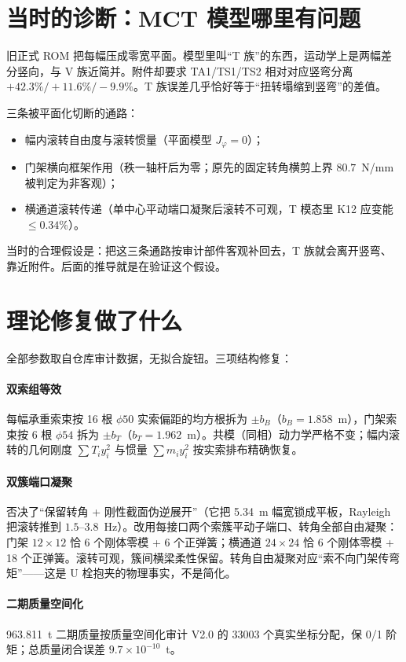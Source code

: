 \documentclass[11pt,a4paper]{ctexart}
\begin{document}
\section{当时的诊断：MCT 模型哪里有问题}

旧正式 ROM 把每幅压成零宽平面。模型里叫``T 族''的东西，运动学上是两幅差分竖向，与 V 族近简并。附件却要求 TA1/TS1/TS2 相对对应竖弯分离 $+42.3\%/+11.6\%/-9.9\%$。T 族误差几乎恰好等于``扭转塌缩到竖弯''的差值。

三条被平面化切断的通路：
\begin{itemize}
  \item 幅内滚转自由度与滚转惯量（平面模型 $J_\varphi=0$）；
  \item 门架横向框架作用（秩一轴杆后为零；原先的固定转角横剪上界 $80.7$~N/mm 被判定为非客观）；
  \item 横通道滚转传递（单中心平动端口凝聚后滚转不可观，T 模态里 K12 应变能 $\le0.34\%$）。
\end{itemize}
当时的合理假设是：把这三条通路按审计部件客观补回去，T 族就会离开竖弯、靠近附件。后面的推导就是在验证这个假设。

\section{理论修复做了什么}

全部参数取自仓库审计数据，无拟合旋钮。三项结构修复：

\paragraph{双索组等效}
每幅承重索束按 16 根 $\phi50$ 实索偏距的均方根拆为 $\pm b_B$（$b_B=1.858$~m），门架索束按 6 根 $\phi54$ 拆为 $\pm b_T$（$b_T=1.962$~m）。共模（同相）动力学严格不变；幅内滚转的几何刚度 $\sum T_i y_i^2$ 与惯量 $\sum m_i y_i^2$ 按实索排布精确恢复。

\paragraph{双簇端口凝聚}
否决了``保留转角 + 刚性截面伪逆展开''（它把 5.34~m 幅宽锁成平板，Rayleigh 把滚转推到 $1.5$--$3.8$~Hz）。改用每接口两个索簇平动子端口、转角全部自由凝聚：门架 $12\times12$ 恰 6 个刚体零模 + 6 个正弹簧；横通道 $24\times24$ 恰 6 个刚体零模 + 18 个正弹簧。滚转可观，簇间横梁柔性保留。转角自由凝聚对应``索不向门架传弯矩''——这是 U 栓抱夹的物理事实，不是简化。

\paragraph{二期质量空间化}
963.811~t 二期质量按质量空间化审计 V2.0 的 33003 个真实坐标分配，保 0/1 阶矩；总质量闭合误差 $9.7\times10^{-10}$~t。
\end{document}
